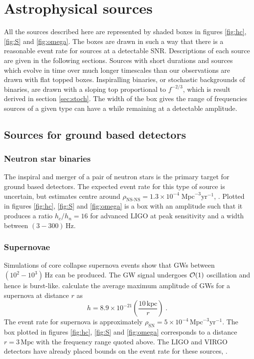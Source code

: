 \section{Astrophysical sources}\label{sec:sources}
All the sources described here are represented by shaded boxes in figures \ref{fig:hc}, \ref{fig:S} and \ref{fig:omega}. The boxes are drawn in such a way that there is a reasonable event rate for sources at a detectable SNR. Descriptions of each source are given in the following sections. Sources with short durations and sources which evolve in time over much longer timescales than our observations are drawn with flat topped boxes. Inspiralling binaries, or stochastic backgrounds of binaries, are drawn with a sloping top proportional to $f^{-2/3}$, which is result derived in section \ref{sec:stoch}. The width of the box gives the range of frequencies sources of a given type can have a while remaining at a detectable amplitude.




\subsection{Sources for ground based detectors}

\subsubsection{Neutron star binaries}
The inspiral and merger of a pair of neutron stars is the primary target for ground based detectors. The expected event rate for this type of source is uncertain, but estimates centre around $\rho_{\textrm{NS-NS}}=1.3\times 10^{-4}\;\textrm{Mpc}^{-3}\textrm{yr}^{-1}$, \cite{CBC}. Plotted in figures \ref{fig:hc}, \ref{fig:S} and \ref{fig:omega} is a box with an amplitude such that it produces a ratio $h_{c}/h_{n}=16$ for advanced LIGO at peak sensitivity and a width between $(3-300)\,\textrm{Hz}$.

\subsubsection{Supernovae}
Simulations of core collapse supernova events show that GWs between $(10^{2}-10^{3})\,\textrm{Hz}$ can be produced. The GW signal undergoes ${\cal{O}}(1)$ oscillation and hence is burst-like. \cite{2002A&A...393..523D} calculate the average maximum amplitude of GWs for a supernova at distance $r$ as
\begin{equation} h=8.9\times 10^{-21}\left( \frac{10 \,\textrm{kpc}}{r} \right) \; .\end{equation}
The event rate for supernova is approximately $\rho_{\textrm{SN}}=5\times10^{-4}\,\textrm{Mpc}^{-3}\textrm{yr}^{-1}$. The box plotted in figures \ref{fig:hc}, \ref{fig:S} and \ref{fig:omega} corresponds to a distance $r=3 \,\textrm{Mpc}$ with the frequency range quoted above. The LIGO and VIRGO detectors have already placed bounds on the event rate for these sources, \cite{Bursts}.

